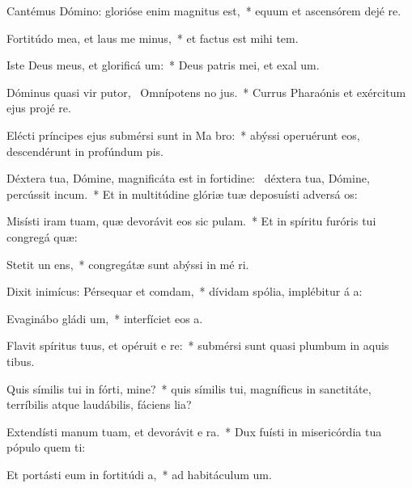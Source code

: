 \item Cantémus Dómino: glorióse enim magnitus est,~* equum et ascensórem dejé  re.
\item Fortitúdo mea, et laus me minus,~* et factus est mihi  tem.
\item Iste Deus meus, et glorificá um:~* Deus patris mei, et exal um.
\item Dóminus quasi vir putor,~\pscross{} Omnípotens no jus.~* Currus Pharaónis et exércitum ejus projé  re.
\item Elécti príncipes ejus submérsi sunt in Ma bro:~* abýssi operuérunt eos, descendérunt in profúndum  pis.
\item Déxtera tua, Dómine, magnificáta est in fortidine:~\pscross{} déxtera tua, Dómine, percússit incum.~* Et in multitúdine glóriæ tuæ deposuísti adversá os:
\item Misísti iram tuam, quæ devorávit eos sic pulam.~* Et in spíritu furóris tui congregá  quæ:
\item Stetit un ens,~* congregátæ sunt abýssi in mé ri.
\item Dixit inimícus: Pérsequar et comdam,~* dívidam spólia, implébitur á a:
\item Evaginábo gládi um,~* interfíciet eos  a.
\item Flavit spíritus tuus, et opéruit e re:~* submérsi sunt quasi plumbum in aquis tibus.
\item Quis símilis tui in fórti, mine?~* quis símilis tui, magníficus in sanctitáte, terríbilis atque laudábilis, fáciens lia?
\item Extendísti manum tuam, et devorávit e ra.~* Dux fuísti in misericórdia tua pópulo quem ti:
\item Et portásti eum in fortitúdi a,~* ad habitáculum  um.

